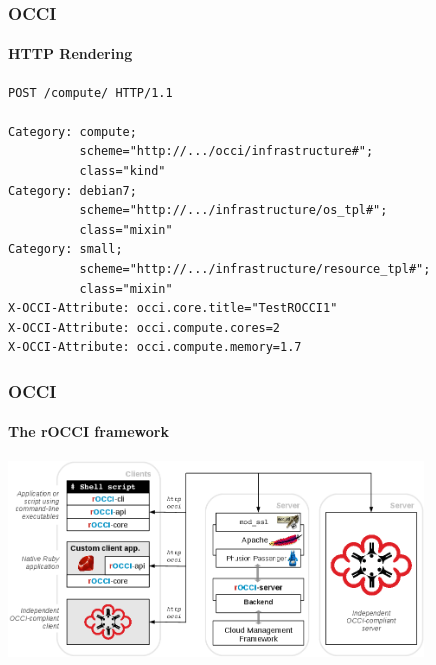 \begin{frame}[fragile]
  \frametitle{OCCI}
  \framesubtitle{HTTP Rendering}

  \Fontsmaller
  \begin{Sbox}
  \begin{minipage}{\linewidth-2\fboxsep-2\fboxrule-4pt}
  \color{white}
  \begin{verbatim}
POST /compute/ HTTP/1.1

Category: compute;
          scheme="http://.../occi/infrastructure#";
          class="kind"
Category: debian7;
          scheme="http://.../infrastructure/os_tpl#";
          class="mixin"
Category: small;
          scheme="http://.../infrastructure/resource_tpl#";
          class="mixin"
X-OCCI-Attribute: occi.core.title="TestROCCI1"
X-OCCI-Attribute: occi.compute.cores=2
X-OCCI-Attribute: occi.compute.memory=1.7
  \end{verbatim}
  \end{minipage}
  \end{Sbox}
\end{frame}

\begin{frame}
  \frametitle{OCCI}
  \framesubtitle{The rOCCI framework}

  \includegraphics[width=11cm]{images/OCCI_client_servers}
\end{frame}
